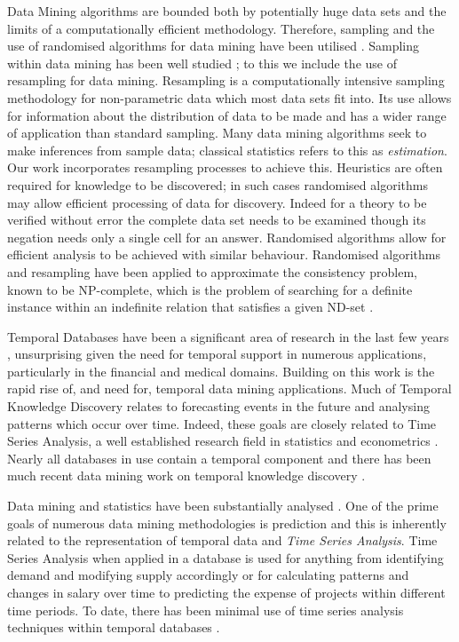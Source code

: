 Data Mining algorithms are bounded both by potentially huge data sets
and the limits of a computationally efficient methodology. Therefore,
sampling and the use of randomised algorithms for data mining have
been utilised \cite{km94,gms97,cl98b}. Sampling within data mining has
been well studied \cite{km94,jl96}; to this we include the use of
resampling for data mining. Resampling is a computationally intensive
sampling methodology for non-parametric data which most data sets fit
into. Its use allows for information about the distribution of data to
be made and has a wider range of application than standard
sampling. Many data mining algorithms seek to make inferences from
sample data; classical statistics refers to this as {\em estimation}. 
Our work incorporates resampling processes \cite{efro79,et86,et93}
to achieve this. Heuristics are often required for knowledge to be
discovered;
in such cases randomised algorithms may allow efficient processing of
data for discovery. Indeed for a theory to be verified without error
the complete data set needs to be examined though its negation needs
only a single cell for an answer. Randomised algorithms allow for
efficient analysis to be achieved with similar behaviour. Randomised
algorithms and resampling have been applied to approximate the
consistency problem, known to be NP-complete, which is the problem of
searching for a definite instance within an indefinite relation that
satisfies a given ND-set \cite{vn95,cl98b,cl98}.

\medskip

Temporal
Databases have been a significant area of research in the last few
years \cite{tcg93,ct95}, unsurprising given the need for temporal
support in numerous applications, particularly in the financial and
medical domains. Building on this work is the rapid rise of, and need
for, temporal data mining applications.  
Much of Temporal Knowledge Discovery relates to forecasting events in the
future and analysing 
patterns which occur over time. Indeed, these goals are closely
related to Time Series Analysis, a well established research field in
statistics and econometrics \cite{end95,naze88}. Nearly all databases
in use contain a 
temporal component and there has been much recent data  mining work on
temporal knowledge discovery \cite{alss95,pt96,bc96,bt98}. 

\medskip

Data mining and statistics have been substantially analysed
\cite{fhs96,gmp97}. One of the prime goals of numerous data mining
methodologies is prediction and this is inherently related to the
representation of temporal data and {\em Time Series Analysis}. Time
Series Analysis when applied in a 
 database is used for anything from identifying demand and modifying
supply accordingly or for calculating patterns and changes in salary over time
to predicting the expense of projects within different time
periods. To date, there has been minimal use of time series analysis
techniques within temporal databases \cite{smd95}.

